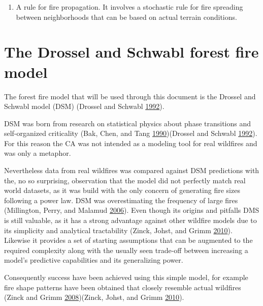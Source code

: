 \documentclass[
]{book}
\providecommand{\tightlist}{%
  \setlength{\itemsep}{0pt}\setlength{\parskip}{0pt}}
\begin{document}
\begin{enumerate}
\def\labelenumi{\arabic{enumi}.}
\setcounter{enumi}{2}
\tightlist
\item
  A rule for fire propagation. It involves a stochastic rule for fire spreading between neighborhoods that can be based on actual terrain conditions.
\end{enumerate}

\hypertarget{the-drossel-and-schwabl-forest-fire-model}{%
\section{The Drossel and Schwabl forest fire model}\label{the-drossel-and-schwabl-forest-fire-model}}

The forest fire model that will be used through this document is the Drossel and Schwabl model (DSM) (Drossel and Schwabl \protect\hyperlink{ref-drossel1992self}{1992}).

DSM was born from research on statistical physics about phase transitions and self-organized criticality (Bak, Chen, and Tang \protect\hyperlink{ref-bak1990forest}{1990})(Drossel and Schwabl \protect\hyperlink{ref-drossel1992self}{1992}). For this reason the CA was not intended as a modeling tool for real wildfires and was only a metaphor.

Nevertheless data from real wildfires was compared against DSM predictions with the, no so surprising, observation that the model did not perfectly match real world datasets, as it was build with the only concern of generating fire sizes following a power law. DSM was overestimating the frequency of large fires (Millington, Perry, and Malamud \protect\hyperlink{ref-millington2006models}{2006}). Even though its origins and pitfalls DMS is still valuable, as it has a strong advantage against other wildfire models due to its simplicity and analytical tractability (Zinck, Johst, and Grimm \protect\hyperlink{ref-zinck2010wildfire}{2010}). Likewise it provides a set of starting assumptions that can be augmented to the required complexity along with the usually seen trade-off between increasing a model's predictive capabilities and its generalizing power.

Consequently success have been achieved using this simple model, for example fire shape patterns have been obtained that closely resemble actual wildfires (Zinck and Grimm \protect\hyperlink{ref-zinck2008more}{2008})(Zinck, Johst, and Grimm \protect\hyperlink{ref-zinck2010wildfire}{2010}).
\end{document}
